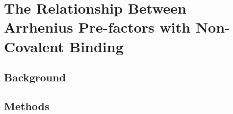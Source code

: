 
\chapter{The Relationship Between Arrhenius Pre-factors with Non-Covalent Binding}
\label{ch:arrhenius}

\section{Background}

\section{Methods}
